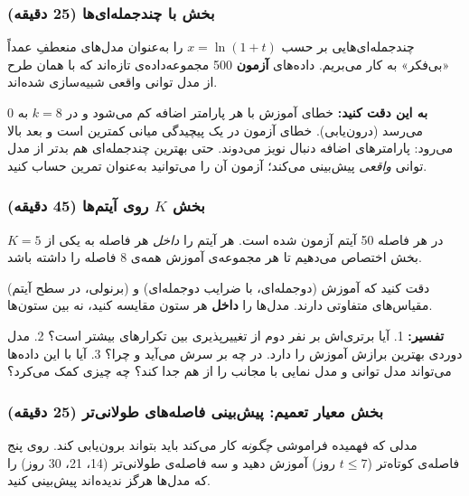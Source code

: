 \subsubsection{\texorpdfstring{بخش  با چندجمله‌ای‌ها
(25 دقیقه)}{بخش A: overfitting با چندجمله‌ای‌ها (25 دقیقه)}}

چندجمله‌ای‌هایی بر حسب \(x = \ln(1+t)\) را به‌عنوان مدل‌های منعطفِ عمداً
«بی‌فکر» به کار می‌بریم. داده‌های \textbf{آزمون} 500 مجموعه‌داده‌ی تازه‌اند که
با همان طرح از مدل توانی واقعی شبیه‌سازی شده‌اند.

\textbf{به این دقت کنید:} خطای آموزش با هر پارامتر اضافه کم می‌شود و در
\(k = 8\) به 0 می‌رسد (درون‌یابی). خطای آزمون در یک پیچیدگی میانی کمترین
است و بعد بالا می‌رود: پارامترهای اضافه دنبال نویز می‌دوند. حتی بهترین
چندجمله‌ای هم بدتر از مدل توانی \emph{واقعی} پیش‌بینی می‌کند؛ 
آزمون آن را می‌توانید به‌عنوان تمرین حساب کنید.

\subsubsection{\texorpdfstring{بخش 
\(K\) روی آیتم‌ها (45
دقیقه)}{بخش B: cross-validation K-fold روی آیتم‌ها (45 دقیقه)}}

در هر فاصله 50 آیتم آزمون شده است. هر آیتم را \emph{داخل} هر فاصله به
یکی از \(K = 5\) بخش اختصاص می‌دهیم تا هر مجموعه‌ی آموزش همه‌ی 8 فاصله را
داشته باشد.

دقت کنید که  آموزش (دوجمله‌ای، با ضرایب دوجمله‌ای) و 
(برنولی، در سطح آیتم) مقیاس‌های متفاوتی دارند. مدل‌ها را \textbf{داخل} هر
ستون مقایسه کنید، نه بین ستون‌ها.

\textbf{تفسیر:} 1. آیا برتری‌اش بر نفر دوم از تغییرپذیری بین تکرارهای
 بیشتر است؟ 2. مدل دوردی بهترین برازش آموزش را دارد. در 
چه بر سرش می‌آید و چرا؟ 3. آیا  با این داده‌ها می‌تواند مدل توانی و
مدل نمایی با مجانب را از هم جدا کند؟ چه چیزی کمک می‌کرد؟

\subsubsection{\texorpdfstring{بخش  معیار تعمیم: پیش‌بینی فاصله‌های
طولانی‌تر (25
دقیقه)}{بخش C: معیار تعمیم: پیش‌بینی فاصله‌های طولانی‌تر (25 دقیقه)}}

مدلی که فهمیده فراموشی \emph{چگونه} کار می‌کند باید بتواند برون‌یابی کند.
روی پنج فاصله‌ی کوتاه‌تر (\(t \le 7\) روز) آموزش دهید و سه فاصله‌ی طولانی‌تر
(14، 21، 30 روز) را که مدل‌ها هرگز ندیده‌اند پیش‌بینی کنید.

